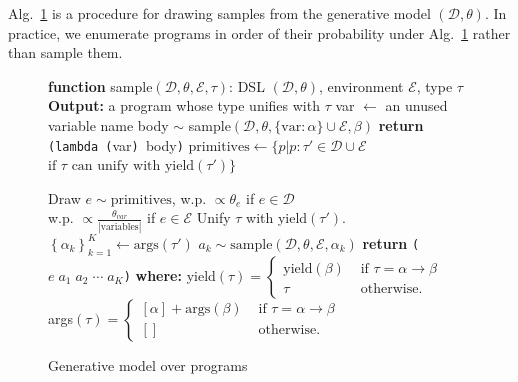 \documentclass{article}
\newcommand{\code}[1]{{\footnotesize\texttt{#1}}}
\begin{document}
Alg.~\ref{programGenerativeModel} is a procedure for drawing
samples from the generative model $(\mathcal{D},\theta)$.  In practice, we
enumerate programs in order of their probability under  Alg.~\ref{programGenerativeModel} rather than sample them.

\begin{figure}
  \begin{minipage}{0.49\textwidth}    
\begin{algorithm}[H]
   \caption{Generative model over programs}
   \label{programGenerativeModel}
   \begin{algorithmic}
     \STATE \textbf{function} sample$(\mathcal{D}, \theta, \mathcal{E}, \tau)$:
   DSL $(\mathcal{D},\theta)$, environment $\mathcal{E}$, type $\tau$
  \STATE \textbf{Output:} a program whose type unifies with $\tau$
  \IF{$\tau = \alpha\to\beta$}
  \STATE var $\gets$ an unused variable name
  \STATE body $\sim$ sample$(\mathcal{D},\theta,\{\text{var}:\alpha\}\cup\mathcal{E},\beta)$
   \STATE \textbf{return} \code{(lambda (}var\code{) }body\code{)}
   \ENDIF
   \STATE $\text{primitives} \gets\{p | p: \tau' \in \mathcal{D}\cup\mathcal{E}$ \\
      \hspace*{6.9em}$\text{if }\tau\text{ can unify with yield}(\tau') \} $
   
   \STATE Draw $e\sim \text{primitives}$, w.p. $\propto\theta_e$ if $e\in \mathcal{D}$ \\
      \hspace*{8.8em}w.p. $\propto\frac{\theta_{var}}{|\text{variables}|}$ if $e\in \mathcal{E}$
   \STATE Unify $\tau$ with yield$(\tau')$.
   \STATE $\left\{\alpha_k \right\}_{k = 1}^K\gets\text{args}(\tau')$ 
 \STATE $a_k\sim\text{sample}(\mathcal{D},\theta,\mathcal{E},\alpha_k)$
 \ENDFOR
 \STATE \textbf{return} \code{(}$e\;a_1\; a_2\; \cdots\; a_K$\code{)}
 \STATE\textbf{where:}
 \STATE yield$(\tau) = \begin{cases}
   \text{yield}(\beta)   &\text{ if }\tau = \alpha\to \beta\\
   \tau   &\text{ otherwise.}
 \end{cases}$ 
 \STATE  args$(\tau) = \begin{cases}
   [\alpha] + \text{args}(\beta)   &\text{ if }\tau = \alpha\to \beta\\
   []   &\text{ otherwise.}
 \end{cases}$
\end{algorithmic}
\end{algorithm}
    \end{minipage}
  \end{figure}
\end{document}
